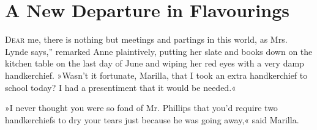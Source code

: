 \chapter{A New Departure in Flavourings}

\lettrine[ante=“,lines=4]{D}{ear} me, there is nothing but meetings and partings in this world, as Mrs. Lynde says,” remarked Anne plaintively, putting her slate and books down on the kitchen table on the last day of June and wiping her red eyes with a very damp handkerchief. »Wasn't it fortunate, Marilla, that I took an extra handkerchief to school today? I had a presentiment that it would be needed.«

»I never thought you were so fond of Mr. Phillips that you'd require two handkerchiefs to dry your tears just because he was going away,« said Marilla.

